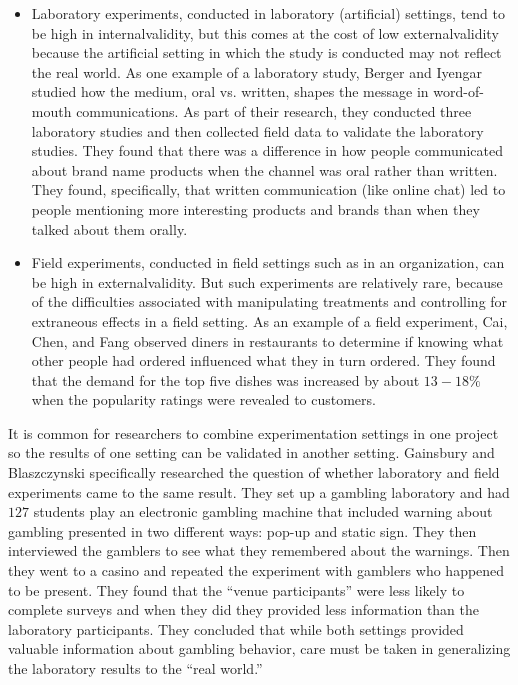 \begin{itemize}
	\item Laboratory experiments, conducted in laboratory (artificial) settings, tend to be high in \gls{internalvalidity}, but this comes at the cost of low \gls{externalvalidity} because the artificial setting in which the study is conducted may not reflect the real world. As one example of a laboratory study, Berger and Iyengar\cite{berger2013communication} studied how the medium, oral vs. written, shapes the message in word-of-mouth communications. As part of their research, they conducted three laboratory studies and then collected field data to validate the laboratory studies. They found that there was a difference in how people communicated about brand name products when the channel was oral rather than written. They found, specifically, that written communication (like online chat) led to people mentioning more interesting products and brands than when they talked about them orally.

	\item Field experiments, conducted in field settings such as in an organization, can be high in \gls{externalvalidity}. But such experiments are relatively rare, because of the difficulties associated with manipulating treatments and controlling for extraneous effects in a field setting. As an example of a field experiment, Cai, Chen, and Fang\cite{cai2009observational} observed diners in restaurants to determine if knowing what other people had ordered influenced what they in turn ordered. They found that the demand for the top five dishes was increased by about $ 13 - 18\% $ when the popularity ratings were revealed to customers. 
\end{itemize}

It is common for researchers to combine experimentation settings in one project so the results of one setting can be validated in another setting. Gainsbury and Blaszczynski\cite{gainsbury2011appropriateness} specifically researched the question of whether laboratory and field experiments came to the same result. They set up a gambling laboratory and had $ 127 $ students play an electronic gambling machine that included warning about gambling presented in two different ways: pop-up and static sign. They then interviewed the gamblers to see what they remembered about the warnings. Then they went to a casino and repeated the experiment with gamblers who happened to be present. They found that the ``venue participants'' were less likely to complete surveys and when they did they provided less information than the laboratory participants. They concluded that while both settings provided valuable information about gambling behavior, care must be taken in generalizing the laboratory results to the ``real world.''

